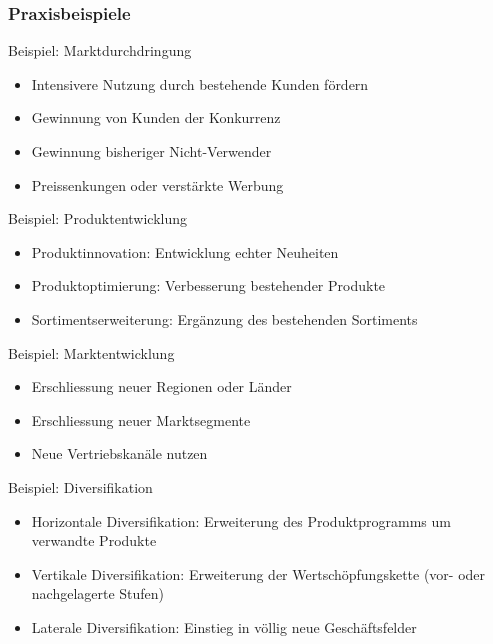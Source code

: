 \subsubsection{Praxisbeispiele}

\small


\begin{example2}{Beispiel: Marktdurchdringung}
\begin{itemize}
    \item Intensivere Nutzung durch bestehende Kunden fördern
    \item Gewinnung von Kunden der Konkurrenz
    \item Gewinnung bisheriger Nicht-Verwender
    \item Preissenkungen oder verstärkte Werbung
\end{itemize}
\end{example2}



\begin{example2}{Beispiel: Produktentwicklung}
\begin{itemize}
    \item Produktinnovation: Entwicklung echter Neuheiten
    \item Produktoptimierung: Verbesserung bestehender Produkte
    \item Sortimentserweiterung: Ergänzung des bestehenden Sortiments
\end{itemize}
\end{example2}

\begin{example2}{Beispiel: Marktentwicklung}
\begin{itemize}
    \item Erschliessung neuer Regionen oder Länder
    \item Erschliessung neuer Marktsegmente
    \item Neue Vertriebskanäle nutzen
\end{itemize}
\end{example2}

\begin{example2}{Beispiel: Diversifikation}
\begin{itemize}
    \item Horizontale Diversifikation: Erweiterung des Produktprogramms um verwandte Produkte
    \item Vertikale Diversifikation: Erweiterung der Wertschöpfungskette (vor- oder nachgelagerte Stufen)
    \item Laterale Diversifikation: Einstieg in völlig neue Geschäftsfelder
\end{itemize}
\end{example2}

\multend



